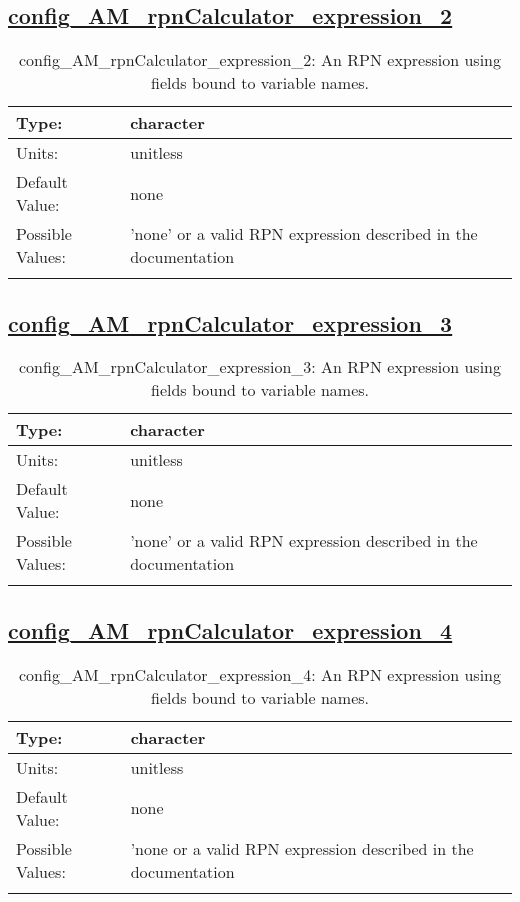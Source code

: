 \subsection[config\_AM\_rpnCalculator\_expression\_2]{\hyperref[sec:nm_tab_AM_rpnCalculator]{config\_AM\_rpnCalculator\_expression\_2}}
\label{subsec:nm_sec_config_AM_rpnCalculator_expression_2}
\begin{center}
\begin{longtable}{| p{2.0in} || p{4.0in} |}
    \hline
    Type: & character \\
    \hline
    Units: & \si{unitless} \\
    \hline
    Default Value: & none \\
    \hline
    Possible Values: & 'none' or a valid RPN expression described in the documentation \\
    \hline
    \caption{config\_AM\_rpnCalculator\_expression\_2: An RPN expression using fields bound to variable names.}
\end{longtable}
\end{center}
\subsection[config\_AM\_rpnCalculator\_expression\_3]{\hyperref[sec:nm_tab_AM_rpnCalculator]{config\_AM\_rpnCalculator\_expression\_3}}
\label{subsec:nm_sec_config_AM_rpnCalculator_expression_3}
\begin{center}
\begin{longtable}{| p{2.0in} || p{4.0in} |}
    \hline
    Type: & character \\
    \hline
    Units: & \si{unitless} \\
    \hline
    Default Value: & none \\
    \hline
    Possible Values: & 'none' or a valid RPN expression described in the documentation \\
    \hline
    \caption{config\_AM\_rpnCalculator\_expression\_3: An RPN expression using fields bound to variable names.}
\end{longtable}
\end{center}
\subsection[config\_AM\_rpnCalculator\_expression\_4]{\hyperref[sec:nm_tab_AM_rpnCalculator]{config\_AM\_rpnCalculator\_expression\_4}}
\label{subsec:nm_sec_config_AM_rpnCalculator_expression_4}
\begin{center}
\begin{longtable}{| p{2.0in} || p{4.0in} |}
    \hline
    Type: & character \\
    \hline
    Units: & \si{unitless} \\
    \hline
    Default Value: & none \\
    \hline
    Possible Values: & 'none or a valid RPN expression described in the documentation \\
    \hline
    \caption{config\_AM\_rpnCalculator\_expression\_4: An RPN expression using fields bound to variable names.}
\end{longtable}
\end{center}
